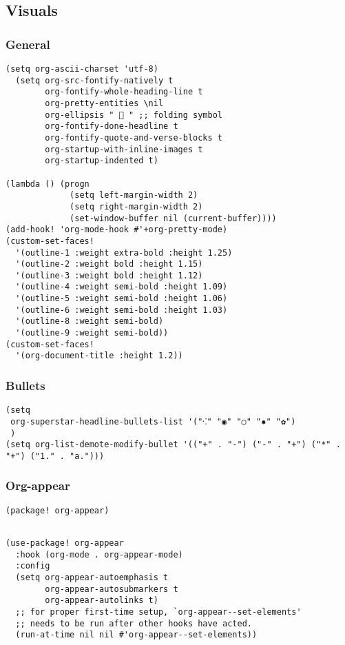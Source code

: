 \documentclass[c]{article}
\theoremstyle{plain}%
\theoremstyle{definition}
\theoremstyle{remark}
\begin{document}
\subsection{Visuals}
\label{sec:orga9d547a}
\subsubsection{General}
\label{sec:orgdaf3af1}
\begin{verbatim}
(setq org-ascii-charset 'utf-8)
  (setq org-src-fontify-natively t
        org-fontify-whole-heading-line t
        org-pretty-entities \nil
        org-ellipsis "  " ;; folding symbol
        org-fontify-done-headline t
        org-fontify-quote-and-verse-blocks t
        org-startup-with-inline-images t
        org-startup-indented t)

(lambda () (progn
             (setq left-margin-width 2)
             (setq right-margin-width 2)
             (set-window-buffer nil (current-buffer))))
(add-hook! 'org-mode-hook #'+org-pretty-mode)
(custom-set-faces!
  '(outline-1 :weight extra-bold :height 1.25)
  '(outline-2 :weight bold :height 1.15)
  '(outline-3 :weight bold :height 1.12)
  '(outline-4 :weight semi-bold :height 1.09)
  '(outline-5 :weight semi-bold :height 1.06)
  '(outline-6 :weight semi-bold :height 1.03)
  '(outline-8 :weight semi-bold)
  '(outline-9 :weight semi-bold))
(custom-set-faces!
  '(org-document-title :height 1.2))
\end{verbatim}
\subsubsection{Bullets}
\label{sec:org006492d}
\begin{verbatim}
(setq
 org-superstar-headline-bullets-list '("⁖" "◉" "○" "✸" "✿")
 )
(setq org-list-demote-modify-bullet '(("+" . "-") ("-" . "+") ("*" . "+") ("1." . "a.")))
\end{verbatim}
\subsubsection{Org-appear}
\label{sec:orgbbb238f}
\begin{verbatim}
(package! org-appear)
\end{verbatim}
\begin{verbatim}

(use-package! org-appear
  :hook (org-mode . org-appear-mode)
  :config
  (setq org-appear-autoemphasis t
        org-appear-autosubmarkers t
        org-appear-autolinks t)
  ;; for proper first-time setup, `org-appear--set-elements'
  ;; needs to be run after other hooks have acted.
  (run-at-time nil nil #'org-appear--set-elements))
\end{verbatim}
\end{document}
